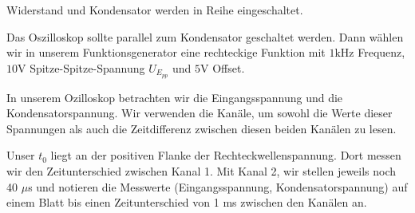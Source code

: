 Widerstand und Kondensator werden in Reihe eingeschaltet.


Das Oszilloskop sollte parallel zum Kondensator geschaltet werden. Dann wählen wir in unserem Funktionsgenerator eine rechteckige Funktion mit $1 \si{\kilo\hertz}$ Frequenz, $10 \si{\volt}$ Spitze-Spitze-Spannung $U_{E_{pp}}$ und $5 \si{\volt}$ Offset.

In unserem Ozilloskop betrachten wir die Eingangsspannung und die Kondensatorspannung. Wir verwenden die Kanäle, um sowohl die Werte dieser Spannungen als auch die Zeitdifferenz zwischen diesen beiden Kanälen zu lesen.


Unser $t_0$ liegt an der positiven Flanke der Rechteckwellenspannung. Dort messen wir den Zeitunterschied zwischen Kanal 1. Mit Kanal 2, wir stellen jeweils noch 40 $\mu$s und notieren die Messwerte (Eingangsspannung, Kondensatorspannung) auf einem Blatt
bis einen Zeitunterschied von 1 ms zwischen den Kanälen an.
%
%
\newpage
